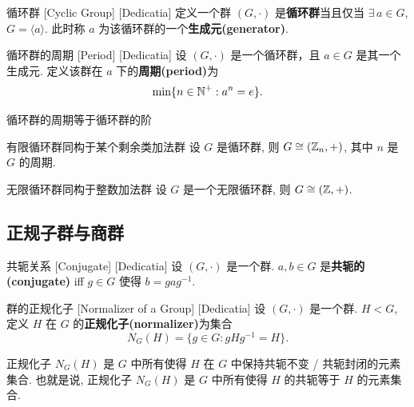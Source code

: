         \begin{dfn}
            {循环群}
            [Cyclic Group]
            [Dedicatia]
            定义一个群 \((G,\cdot)\) 是\textbf{循环群}当且仅当 \(\exists\,a\in G\), \(G=\langle a\rangle\). 此时称 \(a\) 为该循环群的一个\textbf{生成元(generator)}. 
        \end{dfn}

        \begin{dfn}
            [Period]
            {循环群的周期}
            [Period]
            [Dedicatia]
            设 \((G,\cdot)\) 是一个循环群，且 \(a\in G\) 是其一个生成元. 定义该群在 \(a\) 下的\textbf{周期(period)}为
            \[\min\{n\in\operatorname{\mathbb{N}}^+ : a^n=e\}.\]
        \end{dfn}

        \begin{ppt}
            {循环群的周期等于循环群的阶}
        \end{ppt}

        \begin{ppt}
            {有限循环群同构于某个剩余类加法群}
            设 \(G\) 是循环群, 则 \(G \cong(\operatorname{\mathbb{Z}}_n, +)\), 其中 \(n\) 是 \(G\) 的周期.
        \end{ppt}

        \begin{ppt}
            {无限循环群同构于整数加法群}
            设 \(G\) 是一个无限循环群, 则 \(G\cong (\operatorname{\mathbb{Z}},+)\).
        \end{ppt}

    \subsection{正规子群与商群}

        \begin{dfn}
            {共轭关系}
            [Conjugate]
            [Dedicatia]
            设 \((G,\cdot)\) 是一个群. \(a,b\in G\) 是\textbf{共轭的(conjugate)} iff \(g\in G\) 使得 \(b=gag^{-1}\).
        \end{dfn}

        \begin{dfn}
            {群的正规化子}
            [Normalizer of a Group]
            [Dedicatia]
            设 \((G,\cdot)\) 是一个群. \(H<G\), 定义 \(H\) 在 \(G\) 的\textbf{正规化子(normalizer)}为集合
            \[N_G(H)=\{g\in G: gHg^{-1}=H\}.\]
        \end{dfn}

        \begin{rmk}
            正规化子 \(N_G(H)\) 是 \(G\) 中所有使得 \(H\) 在 \(G\) 中保持共轭不变 / 共轭封闭的元素集合. 也就是说, 正规化子 \(N_G(H)\) 是 \(G\) 中所有使得 \(H\) 的共轭等于 \(H\) 的元素集合.
        \end{rmk}

